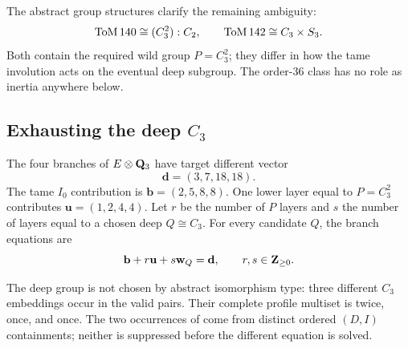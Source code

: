 The abstract group structures clarify the remaining ambiguity:
\[
 \mathrm{ToM}\,140\cong(C_3^2):C_2,\qquad
 \mathrm{ToM}\,142\cong C_3\times S_3.
\]
Both contain the required wild group $P=C_3^2$; they differ in how the tame
involution acts on the eventual deep subgroup.  The order-$36$ class has no
role as inertia anywhere below.

\subsection{\texorpdfstring{Exhausting the deep \(C_3\)}{Exhausting the deep C3}}

The four branches of $E\otimes\mathbf{Q}_3$ have target different vector
\begin{equation}
 \mathbf d=(3,7,18,18).
\label{eq:p3-target-different}
\end{equation}
The tame $I_0$ contribution is $\mathbf b=(2,5,8,8)$.  One lower layer equal
to $P=C_3^2$ contributes $\mathbf u=(1,2,4,4)$.  Let $r$ be the number of
$P$ layers and $s$ the number of layers equal to a chosen deep
$Q\cong C_3$.  For every candidate $Q$, the branch equations are
\begin{equation}
 \mathbf b+r\mathbf u+s\mathbf w_Q=\mathbf d,\qquad
 r,s\in\mathbf{Z}_{\geq0}.
\label{eq:p3-branch-equation}
\end{equation}

The deep group is not chosen by abstract isomorphism type: three different
$C_3$ embeddings occur in the valid pairs.  Their complete profile multiset
is  twice,  once, and  once.  The two occurrences of
 come from distinct ordered $(D,I)$ containments; neither is
suppressed before the different equation is solved.

\begin{table}[ht]
\centering
\caption{Exact deep-$C_3$ exhaustion.  Orbit notation is run-length
notation, and every fraction is exact.}
\label{tab:p3-deep-exhaustion}
\end{table}

